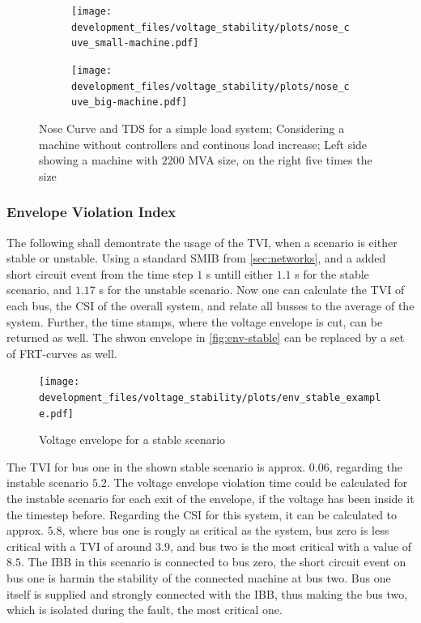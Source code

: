 \begin{figure}[htbp!]
    \centering
    \begin{subfigure}[b]{.49\linewidth}
        \centering
        \texttt{[image: development\_files/voltage\_stability/plots/nose\_cuve\_small-machine.pdf]}
    \end{subfigure}
    \begin{subfigure}[b]{.49\linewidth}
        \centering
        \texttt{[image: development\_files/voltage\_stability/plots/nose\_cuve\_big-machine.pdf]}
    \end{subfigure}
    \caption[Nose Curve and \acs{TDS} for a simple load system without machine controllers]{Nose Curve and \acs{TDS} for a simple load system; Considering a machine without controllers and continous load increase; Left side showing a machine with $2200$ MVA size, on the right five times the size}
    \label{fig:tds-nose-curve-machine-sizes}
\end{figure}


\subsubsection{Envelope Violation Index}

The following shall demontrate the usage of the \acf{TVI}, when a scenario is either stable or unstable.
Using a standard \acs{SMIB} from \autoref{sec:networks}, and a added short circuit event from the time step $1$ s untill either $1.1$ s for the stable scenario, and $1.17$ s for the unstable scenario.
Now one can calculate the \acs{TVI} of each bus, the \acs{CSI} of the overall system, and relate all busses to the average of the system.
Further, the time stamps, where the voltage envelope is cut, can be returned as well. 
The shwon envelope in \autoref{fig:env-stable} can be replaced by a set of \acs{FRT}-curves as well.

\begin{figure}[htbp!]
    \centering
    \texttt{[image: development\_files/voltage\_stability/plots/env\_stable\_example.pdf]}
    \caption[Voltage envelope for a stable scenario]{Voltage envelope for a stable scenario}
    \label{fig:env-stable}
\end{figure}

The \acs{TVI} for bus one in the shown stable scenario is approx. $0.06$, regarding the instable scenario $5.2$.
The voltage envelope violation time could be calculated for the instable scenario for each exit of the envelope, if the voltage has been inside it the timestep before.
Regarding the \acs{CSI} for this system, it can be calculated to approx. $5.8$, where bus one is rougly as critical as the system, bus zero is less critical with a \acs{TVI} of around $3.9$, and bus two is the most critical with a value of $8.5$.
The \acs{IBB} in this scenario is connected to bus zero, the short circuit event on bus one is harmin the stability of the connected machine at bus two. 
Bus one itself is supplied and strongly connected with the \acs{IBB}, thus making the bus two, which is isolated during the fault, the most critical one.

